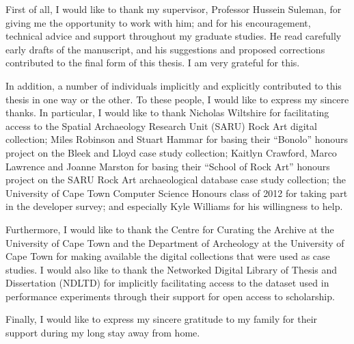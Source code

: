 First of all, I would like to thank my supervisor, Professor Hussein Suleman, for giving me the opportunity to work with him; and for his encouragement, technical advice and support throughout my graduate studies. He read carefully early drafts of the manuscript, and his suggestions and proposed corrections contributed to the final form of this thesis. I am very grateful for this.

In addition, a number of individuals implicitly and explicitly contributed to this thesis in one way or the other. To these people, I would like to express my sincere thanks. In particular, I would like to thank Nicholas Wiltshire for facilitating access to the Spatial Archaeology Research Unit (SARU) Rock Art digital collection; Miles Robinson and Stuart Hammar for basing their ``Bonolo'' honours project on the Bleek and Lloyd case study collection; Kaitlyn Crawford, Marco Lawrence and Joanne Marston for basing their ``School of Rock Art'' honours project on the SARU Rock Art archaeological database case study collection; the University of Cape Town Computer Science Honours class of 2012 for taking part in the developer survey; and especially Kyle Williams for his willingness to help. 


Furthermore, I would like to thank the Centre for Curating the Archive at the University of Cape Town and the Department of Archeology at the University of Cape Town for making available the digital collections that were used as case studies. I would also like to thank the Networked Digital Library of Thesis and Dissertation (NDLTD) for implicitly facilitating access to the dataset used in performance experiments through their support for open access to scholarship.

Finally, I would like to express my sincere gratitude to my family for their support during my long stay away from home.
